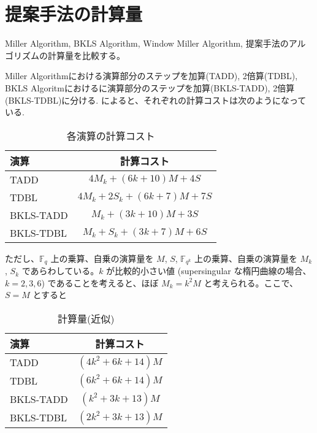 \section{提案手法の計算量}
Miller Algorithm, BKLS Algorithm, Window Miller Algorithm, 提案手法のアルゴリズムの計算量を比較する。
\par
Miller Algorithmにおける演算部分のステップを加算(TADD), 2倍算(TDBL), BKLS Algoritmにおけるに演算部分のステップを加算(BKLS-TADD), 2倍算(BKLS-TDBL)に分ける. \cite{TATE}によると、それぞれの計算コストは次のようになっている.
\begin{table}[htbp]
 \begin{center}
  \begin{tabular}{|l|c|}
  \hline
  演算 & 計算コスト \\
  \hline
  TADD & $4M_k + (6k+10)M + 4S$ \\
  \hline
  TDBL & $4M_k + 2S_k + (6k+7)M + 7S$ \\
  \hline
  BKLS-TADD & $M_k + (3k+10)M + 3S$ \\
  \hline
  BKLS-TDBL & $M_k + S_k + (3k+7)M + 6S$ \\
  \hline
  \end{tabular}
 \end{center}
 \caption{各演算の計算コスト}
\end{table}
\par
ただし、$\mathbb F_q$ 上の乗算、自乗の演算量を $M$, $S$, $\mathbb F_{q^k}$ 上の乗算、自乗の演算量を $M_k$, $S_k$ であらわしている。$k$ が比較的小さい値 (supersingular な楕円曲線の場合、$k = 2, 3, 6$) であることを考えると、ほぼ $M_k = k^2M$ と考えられる。ここで、 $S = M$ とすると \\

\begin{table}[htbp]
\begin{center}
\begin{tabular}{|l|c|}
\hline
 演算 & 計算コスト\\
 \hline
 TADD & $(4k^2 + 6k + 14)M$ \\
 \hline
 TDBL & $(6k^2 + 6k + 14)M$ \\
 \hline
  BKLS-TADD & $(k^2 + 3k + 13)M$ \\
  \hline
  BKLS-TDBL & $(2k^2 + 3k + 13)M$ \\
  \hline
\end{tabular}
\end{center}
\caption{計算量(近似)}
\end{table}

